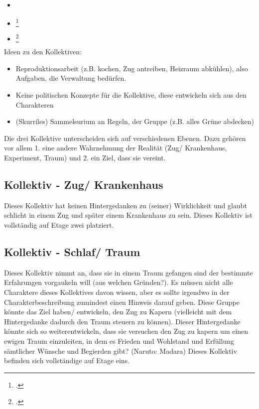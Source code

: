 \documentclass[12pt, a4paper, openany]{report}
\begin{document}
\begin{itemize}
    \item[]  \\
    \item[] \footcite[][§ 147, S. 162]{hegel_grundlinien_2017} \\
    \item[] \footcite[][§151, S. 166]{hegel_grundlinien_2017}
\end{itemize}

Ideen zu den Kollektiven:
\begin{itemize}
\item Reproduktionsarbeit (z.B. kochen, Zug antreiben, Heizraum abkühlen), also Aufgaben, die Verwaltung bedürfen.
\item Keine politischen Konzepte für die Kollektive, diese entwickeln sich aus den Charakteren 
\item (Skurriles) Sammelsurium an Regeln, der Gruppe (z.B. alles Grüne abdecken)
\end{itemize}

Die drei Kollektive unterscheiden sich auf verschiedenen Ebenen. 
Dazu gehören vor allem 1. eine andere Wahrnehmung der Realität (Zug/ Krankenhaus, Experiment, Traum) und 2. ein Ziel, dass sie vereint.

\subsection{Kollektiv - Zug/ Krankenhaus}
Dieses Kollektiv hat keinen Hintergedanken zu (seiner) Wirklichkeit und glaubt schlicht in einem Zug und später einem Krankenhaus zu sein. 
Dieses Kollektiv ist vollständig auf Etage zwei platziert. 

\subsection{Kollektiv - Schlaf/ Traum}
Dieses Kollektiv nimmt an, dass sie in einem Traum gefangen sind der bestimmte Erfahrungen vorgaukeln will (aus welchen Gründen?).
Es müssen nicht alle Charaktere dieses Kollektives davon wissen, aber es sollte irgendwo in der Charakterbeschreibung zumindest einen Hinweis darauf geben.
Diese Gruppe könnte das Ziel haben/ entwickeln, den Zug zu Kapern (vielleicht mit dem Hintergedanke dadurch den Traum steuern zu können).
Dieser Hintergedanke könnte sich so weiterentwickeln, dass sie versuchen den Zug zu kapern um einen ewigen Traum einzuleiten, in dem es Frieden und Wohlstand und Erfüllung sämtlicher Wünsche und Begierden gibt? (Naruto: Madara)
Dieses Kollektiv befinden sich vollständige auf Etage eins.
\end{document}
